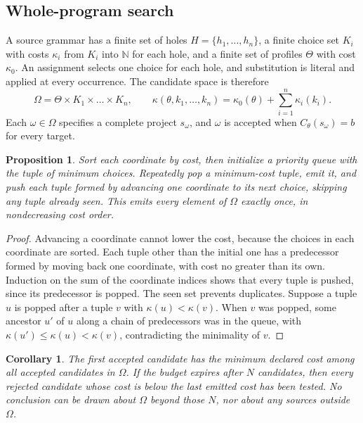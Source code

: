 \documentclass[11pt]{article}
\newtheorem{proposition}[theorem]{Proposition}
\newtheorem{corollary}[theorem]{Corollary}
\theoremstyle{definition}
\theoremstyle{remark}
\newcommand{\N}{\mathbb{N}}
\begin{document}
\subsection{Whole-program search}

A source grammar has a finite set of holes $H = \{h_1, \dots, h_n\}$, a finite choice set $K_i$ with costs $\kappa_i$ from $K_i$ into $\N$ for each hole, and a finite set of profiles $\Theta$ with cost $\kappa_0$. An assignment selects one choice for each hole, and substitution is literal and applied at every occurrence. The candidate space is therefore
\[
  \Omega = \Theta \times K_1 \times \dots \times K_n, \qquad
  \kappa(\theta, k_1, \dots, k_n) = \kappa_0(\theta) + \sum_{i=1}^n \kappa_i(k_i).
\]
Each $\omega \in \Omega$ specifies a complete project $s_\omega$, and $\omega$ is accepted when $C_\theta(s_\omega) = b$ for every target.

\begin{proposition}\label{prop:order}
Sort each coordinate by cost, then initialize a priority queue with the tuple of minimum choices. Repeatedly pop a minimum-cost tuple, emit it, and push each tuple formed by advancing one coordinate to its next choice, skipping any tuple already seen. This emits every element of $\Omega$ exactly once, in nondecreasing cost order.
\end{proposition}

\begin{proof}
Advancing a coordinate cannot lower the cost, because the choices in each coordinate are sorted. Each tuple other than the initial one has a predecessor formed by moving back one coordinate, with cost no greater than its own. Induction on the sum of the coordinate indices shows that every tuple is pushed, since its predecessor is popped. The seen set prevents duplicates. Suppose a tuple $u$ is popped after a tuple $v$ with $\kappa(u) < \kappa(v)$. When $v$ was popped, some ancestor $u'$ of $u$ along a chain of predecessors was in the queue, with $\kappa(u') \le \kappa(u) < \kappa(v)$, contradicting the minimality of $v$.
\end{proof}

\begin{corollary}
The first accepted candidate has the minimum declared cost among all accepted candidates in $\Omega$. If the budget expires after $N$ candidates, then every rejected candidate whose cost is below the last emitted cost has been tested. No conclusion can be drawn about $\Omega$ beyond those $N$, nor about any sources outside $\Omega$.
\end{corollary}
\end{document}
